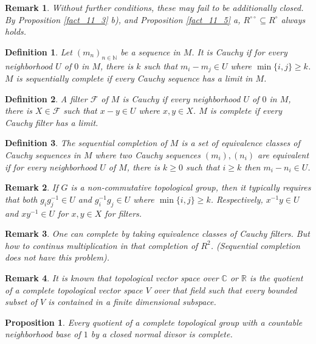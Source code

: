 \documentclass[8pt]{article}
\numberwithin{equation}{section}
\newtheorem{proposition}{Proposition}[subsection]
\newtheorem{definition}{Definition}[subsection]
\newtheorem{remark}{Remark}[subsection]
\newcommand{\N}[0]{\mathbb{N}}
\newcommand{\R}[0]{\mathbb{R}}
\newcommand{\C}[0]{\mathbb{C}}
\newcommand{\dcirc}[0]{{\circ\circ}}
\begin{document}
\begin{remark}
    Without further conditions, these may fail to be additionally closed. By Proposition \ref{fact_11_3} b), and Proposition \ref{fact_11_5} a, $R^\dcirc\subseteq R^\circ$ always holds. %
\end{remark}
\begin{definition}
    \label{definition_11_5_1}
    Let $(m_n)_{n\in\N}$ be a sequence in $M$. It is Cauchy if for every neighborhood $U$ of $0$ in $M$, there is $k$ such that $m_i-m_j\in U$ where $\min\{i,j\}\geq k$. $M$ is sequentially complete if every Cauchy sequence has a limit in $M$.
\end{definition}
\begin{definition}
    \label{definition_11_5_2}
    A filter $\mathcal{F}$ of $M$ is Cauchy if every neighborhood $U$ of $0$ in $M$, there is $X\in\mathcal{F}$ such that $x-y\in U$ where $x,y\in X$. $M$ is complete if every Cauchy filter has a limit.
\end{definition}
\begin{definition}
    \label{definition_11_5_3}
    The sequential completion of $M$ is a set of equivalence classes of Cauchy sequences in $M$ where two Cauchy sequences $(m_i),(n_i)$ are equivalent if for every neighborhood $U$ of $M$, there is $k\geq0$ such that $i\geq k$ then $m_i-n_i\in U$.
\end{definition}
\begin{remark}
    If $G$ is a non-commutative topological group, then it typically requires that both $g_ig_j^{-1}\in U$ and $g_i^{-1}g_j\in U$ where $\min\{i,j\}\geq k$. Respectively, $x^{-1}y\in U$ and $xy^{-1}\in U$ for $x,y\in X$ for filters.
\end{remark}
\begin{remark}
    One can complete by taking equivalence classes of Cauchy filters. But how to continus multiplication in that completion of $R^2$. (Sequential completion does not have this problem).
\end{remark}
\begin{remark}
    It is known that topological vector space over $\C$ or $\R$ is the quotient of a complete topological vector space $V$ over that field such that every bounded subset of $V$ is contained in a finite dimensional subspace.
\end{remark}
\begin{proposition}
    \label{fact_11_7}
    Every quotient of a complete topological group with a countable neighborhood base of $1$ by a closed normal divsor is complete.
\end{proposition}
\end{document}
